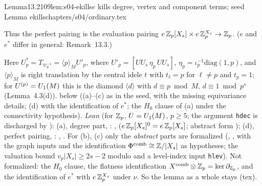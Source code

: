 \begin{quoted}{Lemma}{13.2}{109}{lem:s04-ekills}{$e$ kills degree, vertex and component terms; seed Lemma ekills}{chapters/s04/ordinary.tex}
\begin{enumerate}[label=(\alph*)]
  Thus the perfect pairing is the evaluation pairing $e\,\mathbb{Z}_p[X_s]\times e\,\mathbb{Z}_p^{X_s}\to\mathbb{Z}_p$. ($e$ and $e^*$ differ in general:
  Remark~13.3.)
\end{enumerate}
Here $U_p^*=T_{\varpi_p^{-1}}=\langle p\rangle_MU'_p$, where $U'_p=[UU_s\,\eta_p\,UU_s]$, $\eta_p=\iota_p^{-1}\mathrm{diag}(1,p)$, and
$\langle p\rangle_M$ is right translation by the central idele $t$ with $t_\ell=p$ for $\ell\ne p$ and $t_p=1$; for
$U^{(p)}=U_1(M)$ this is the diamond $\langle d\rangle$ with $d\equiv p\bmod M$, $d\equiv1\bmod p^s$ (Lemma~4.3(d)).
\stproved{} below ((a)--(c) as in the seed, with the missing equivariance details; (d) with the identification of $e^*$; the
$H_0$ clause of (a) under the connectivity hypothesis). \emph{Lean} (for $\mathbb{Z}_p$, $U=U_1(M)$, $p\ge5$; the argument \texttt{hdec} is discharged by
): (a), degree part, \stformal: ,
 ($e\,\mathbb{Z}_p[X_s]^0=e\,\mathbb{Z}_p[X_s]$; abstract form ); (d), perfect pairing,
\stformal: , . For (b), (c) only
the \emph{abstract} parts are formalized (, , with the
graph inputs and the identification $\Phi^{\mathrm{comb}}\cong\mathbb{Z}/|X_s|$ as hypotheses; the valuation bound $v_p|X_s|\ge2s-2$ modulo  and a level-index input
\texttt{hlev}). Not formalized: the $H_0$ clause, the flatness identification $X^{\mathrm{comb}}\otimes\mathbb{Z}_p=\ker\partial_{\mathbb{Z}_p}$, and the identification of $e^*$ with $e\,\mathbb{Z}_p^{X_s}$
under $\nu$. So the lemma as a whole stays \stproved{} (tex).
\end{quoted}
